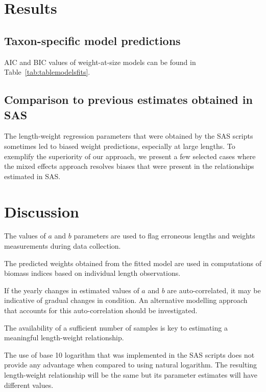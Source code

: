 \documentclass[12pt]{article}\usepackage[]{graphicx}\usepackage[]{color}
\begin{document}
\section{Results}\label{results}

\subsection{Taxon-specific model predictions}\label{taxon-specific-model-predictions}

AIC and BIC values of weight-at-size models can be found in Table~\ref{tab:tablemodelsfits}.

\subsection{Comparison to previous estimates obtained in SAS}\label{comparison-to-previous-estimates-obtained-in-sas}

The length-weight regression parameters that were obtained by the SAS scripts sometimes led to biased weight predictions, especially at large lengths. To exemplify the superiority of our approach, we present a few selected cases where the mixed effects approach resolves biases that were present in the relationships estimated in SAS.

\section{Discussion}\label{discussion}

The values of \(a\) and \(b\) parameters are used to flag erroneous lengths and weights measurements during data collection.

The predicted weights obtained from the fitted model are used in computations of biomass indices based on individual length observations.

If the yearly changes in estimated values of \(a\) and \(b\) are auto-correlated, it may be indicative of gradual changes in condition. An alternative modelling approach that accounts for this auto-correlation should be investigated.

The availability of a sufficient number of samples is key to estimating a meaningful length-weight relationship.

The use of base 10 logarithm that was implemented in the SAS scripts does not provide any advantage when compared to using natural logarithm. The resulting length-weight relationship will be the same but its parameter estimates will have different values.
\end{document}
